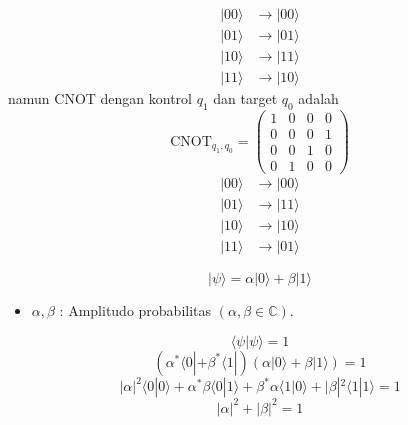 \begin{equation}
    \begin{split}
    |00\rangle &\to |00\rangle \\ 
    |01\rangle &\to |01\rangle \\ 
    |10\rangle &\to |11\rangle \\ 
    |11\rangle &\to |10\rangle
\end{split}
\end{equation}
namun CNOT dengan kontrol $q_1$ dan target $q_0$ adalah 
\begin{equation}
    \text{CNOT}_{q_1, q_0} = \begin{pmatrix} 1 & 0 & 0 & 0 \\ 0 & 0 & 0 & 1 \\ 0 & 0 & 1 & 0 \\ 0 & 1 & 0 & 0 \end{pmatrix}
\end{equation}
\begin{equation}
    \begin{split}
    |00\rangle &\to |00\rangle \\ 
    |01\rangle &\to |11\rangle \\ 
    |10\rangle &\to |10\rangle \\ 
    |11\rangle &\to |01\rangle
\end{split}
\end{equation}

\begin{equation}
    |\psi\rangle = \alpha |0\rangle + \beta |1\rangle
\end{equation}
\begin{itemize}
    \item $\alpha, \beta$ : Amplitudo probabilitas $(\alpha, \beta \in \mathbb{C})$.
\end{itemize}

\begin{equation}
    \langle \psi | \psi \rangle = 1
\end{equation}
\begin{equation}
    (\alpha^* \langle 0 | + \beta^* \langle 1 |) (\alpha |0\rangle + \beta |1\rangle) = 1
\end{equation}
\begin{equation}
    |\alpha|^2 \langle 0|0\rangle + \alpha^* \beta \langle 0|1\rangle + \beta^* \alpha \langle 1|0\rangle + |\beta|^2 \langle 1|1\rangle = 1
\end{equation}
\begin{equation}
    |\alpha|^2 + |\beta|^2 = 1
\end{equation}


